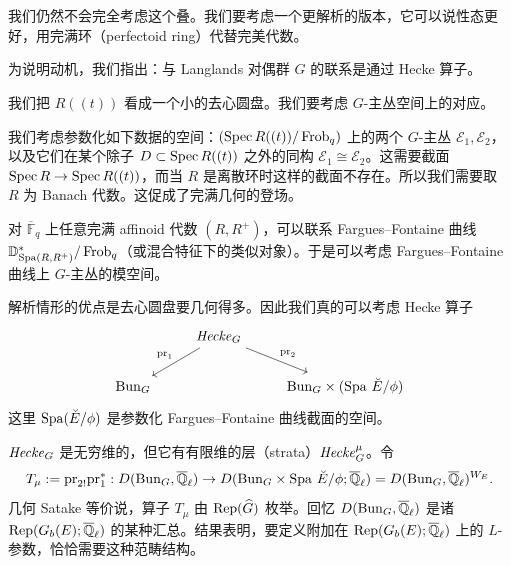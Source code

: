 \subsubsection{}

我们仍然不会完全考虑这个叠。我们要考虑一个更解析的版本，它可以说性态更好，用完满环（perfectoid ring）代替完美代数。

为说明动机，我们指出：与 Langlands 对偶群 $\widehat{G}$ 的联系是通过 Hecke 算子。

我们把 $R((t))$ 看成一个小的去心圆盘。我们要考虑 $G$-主丛空间上的对应。

我们考虑参数化如下数据的空间：$(\operatorname{Spec} R((t))/\operatorname{Frob}_q)$ 上的两个 $G$-主丛 $\mathcal{E}_1,\mathcal{E}_2$，以及它们在某个除子 $D\subset\operatorname{Spec} R((t))$ 之外的同构 $\mathcal{E}_1\cong\mathcal{E}_2$。这需要截面 $\operatorname{Spec} R\to\operatorname{Spec} R((t))$，而当 $R$ 是离散环时这样的截面不存在。所以我们需要取 $R$ 为 Banach 代数。这促成了完满几何的登场。

对 $\overline{\mathbb{F}}_q$ 上任意完满 affinoid 代数 $(R,R^+)$，可以联系 Fargues--Fontaine 曲线 \mbox{$\mathbb{D}^*_{\operatorname{Spa}(R,R^+)}/\operatorname{Frob}_q$}（或混合特征下的类似对象）。于是可以考虑 Fargues--Fontaine 曲线上 $G$-主丛的模空间。

解析情形的优点是去心圆盘要几何得多。因此我们真的可以考虑 Hecke 算子
\[
\begin{tikzcd}
& \Hck_G \arrow[dl, "\mathrm{pr}_1"'] \arrow[dr, "\mathrm{pr}_2"] & \\
\Bun_G & & \Bun_G\times(\Spa\,\breveE/\phi)
\end{tikzcd}
\]
这里 $\operatorname{Spa}(\breve{E}/\phi)$ 是参数化 Fargues--Fontaine 曲线截面的空间。

$\mathit{Hecke}_G$ 是无穷维的，但它有有限维的层（strata）$\mathit{Hecke}_G^\mu$。令
\[
T_\mu:=\mathrm{pr}_{2!}\mathrm{pr}_1^*:D(\mathrm{Bun}_G,\overline{\mathbb{Q}}_\ell)\to D(\mathrm{Bun}_G\times\operatorname{Spa}\,\breve{E}/\phi;\overline{\mathbb{Q}}_\ell)=D(\mathrm{Bun}_G,\overline{\mathbb{Q}}_\ell)^{W_E}.
\]
几何 Satake 等价说，算子 $T_\mu$ 由 $\operatorname{Rep}(\widehat{G})$ 枚举。回忆 $D(\mathrm{Bun}_G,\overline{\mathbb{Q}}_\ell)$ 是诸 $\operatorname{Rep}(G_b(E);\overline{\mathbb{Q}}_\ell)$ 的某种汇总。结果表明，要定义附加在 $\operatorname{Rep}(G_b(E);\overline{\mathbb{Q}}_\ell)$ 上的 $L$-参数，恰恰需要这种范畴结构。
